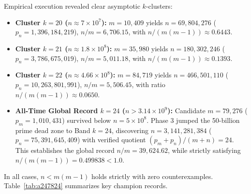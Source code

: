 \documentclass[11pt,a4paper]{article}
\theoremstyle{definition}
\theoremstyle{remark}
\begin{document}
Empirical execution revealed clear asymptotic $k$-clusters:
\begin{itemize}
    \item \textbf{Cluster $k = 20$ ($n \approx 7 \times 10^7$):} $m = 10,409$ yields $n = 69,804,276$ ($p_n = 1,396,184,219$), $n/m = 6,706.15$, with $n/(m(m-1)) \approx 0.6443$.
    \item \textbf{Cluster $k = 21$ ($n \approx 1.8 \times 10^8$):} $m = 35,980$ yields $n = 180,302,246$ ($p_n = 3,786,675,019$), $n/m = 5,011.18$, with $n/(m(m-1)) \approx 0.1393$.
    \item \textbf{Cluster $k = 22$ ($n \approx 4.66 \times 10^8$):} $m = 84,719$ yields $n = 466,501,110$ ($p_n = 10,263,801,991$), $n/m = 5,506.45$, with ratio $n/(m(m-1)) \approx 0.0650$.
    \item \textbf{All-Time Global Record $k = 24$ ($n > 3.14 \times 10^9$):} Candidate $m = 79,276$ ($p_m = 1,010,431$) survived below $n = 5 \times 10^8$. Phase 3 jumped the 50-billion prime dead zone to Band $k = 24$, discovering $n = 3,141,281,384$ ($p_n = 75,391,645,409$) with verified quotient $(p_m + p_n)/(m + n) = 24$. This establishes the global record $n/m = 39,624.62$, while strictly satisfying $n / (m(m-1)) = 0.499838 < 1.0$.
\end{itemize}
In all cases, $n < m(m-1)$ holds strictly with zero counterexamples. Table~\ref{tab:a247824} summarizes key champion records.
\end{document}
